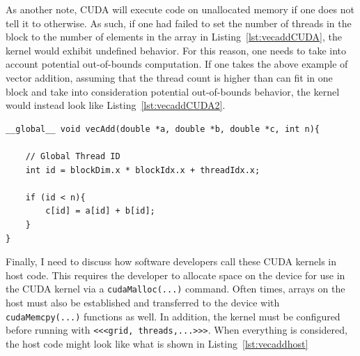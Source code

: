 As another note, CUDA will execute code on unallocated memory if one does not tell it to otherwise.
As such, if one had failed to set the number of threads in the block to the number of elements in the array in Listing~\ref{lst:vecaddCUDA}, the kernel would exhibit undefined behavior.
For this reason, one needs to take into account potential out-of-bounds computation.
If one takes the above example of vector addition, assuming that the thread count is higher than can fit in one block and take into consideration potential out-of-bounds behavior, the kernel would instead look like Listing~\ref{lst:vecaddCUDA2}.

\begin{lstlisting}[float,label=lst:vecaddCUDA2, style=c++,caption={An example of a vector addition kernel in CUDA using blocks and threads, and ensuring no computation happens beyond the size of the array, $n$.}]
__global__ void vecAdd(double *a, double *b, double *c, int n){

    // Global Thread ID
    int id = blockDim.x * blockIdx.x + threadIdx.x;

    if (id < n){
        c[id] = a[id] + b[id];
    }
}
\end{lstlisting}

Finally, I need to discuss how software developers call these CUDA kernels in host code.
This requires the developer to allocate space on the device for use in the CUDA kernel via a \texttt{cudaMalloc(...)} command.
Often times, arrays on the host must also be established and transferred to the device with \texttt{cudaMemcpy(...)} functions as well.
In addition, the kernel must be configured before running with \lstinline{<<<grid, threads,...>>>}.
When everything is considered, the host code might look like what is shown in Listing~\ref{lst:vecaddhost}


